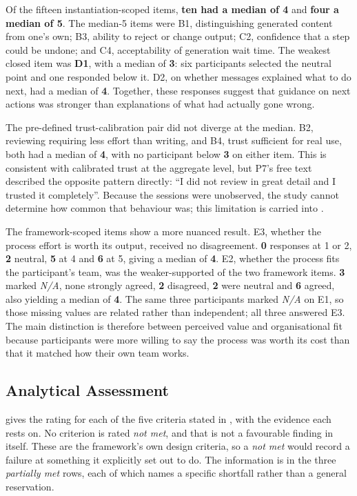 Of the fifteen instantiation-scoped items, \textbf{ten had a median of 4} and \textbf{four a median of 5}. The median-5 items were B1, distinguishing generated content from one's own; B3, ability to reject or change output; C2, confidence that a step could be undone; and C4, acceptability of generation wait time. The weakest closed item was \textbf{D1}, with a median of \textbf{3}: six participants selected the neutral point and one responded below it. D2, on whether messages explained what to do next, had a median of \textbf{4}. Together, these responses suggest that guidance on next actions was stronger than explanations of what had actually gone wrong.

The pre-defined trust-calibration pair did not diverge at the median. B2, reviewing requiring less effort than writing, and B4, trust sufficient for real use, both had a median of \textbf{4}, with no participant below \textbf{3} on either item. This is consistent with calibrated trust at the aggregate level, but P7's free text described the opposite pattern directly: ``I did not review in great detail and I trusted it completely''. Because the sessions were unobserved, the study cannot determine how common that behaviour was; this limitation is carried into .

The framework-scoped items show a more nuanced result. E3, whether the process effort is worth its output, received no disagreement. \textbf{0} responses at 1 or 2, \textbf{2} neutral, \textbf{5} at 4 and \textbf{6} at 5, giving a median of \textbf{4}. E2, whether the process fits the participant's team, was the weaker-supported of the two framework items. \textbf{3} marked \emph{N/A}, none strongly agreed, \textbf{2} disagreed, \textbf{2} were neutral and \textbf{6} agreed, also yielding a median of \textbf{4}. The same three participants marked \emph{N/A} on E1, so those missing values are related rather than independent; all three answered E3. The main distinction is therefore between perceived value and organisational fit because participants were more willing to say the process was worth its cost than that it matched how their own team works.

\subsection{Analytical Assessment}
\label{sec:results_analytical}

 gives the rating for each of the five criteria stated in , with the evidence each rests on. No criterion is rated \emph{not met}, and that is not a favourable finding in itself. These are the framework's own design criteria, so a \emph{not met} would record a failure at something it explicitly set out to do. The information is in the three \emph{partially met} rows, each of which names a specific shortfall rather than a general reservation.

